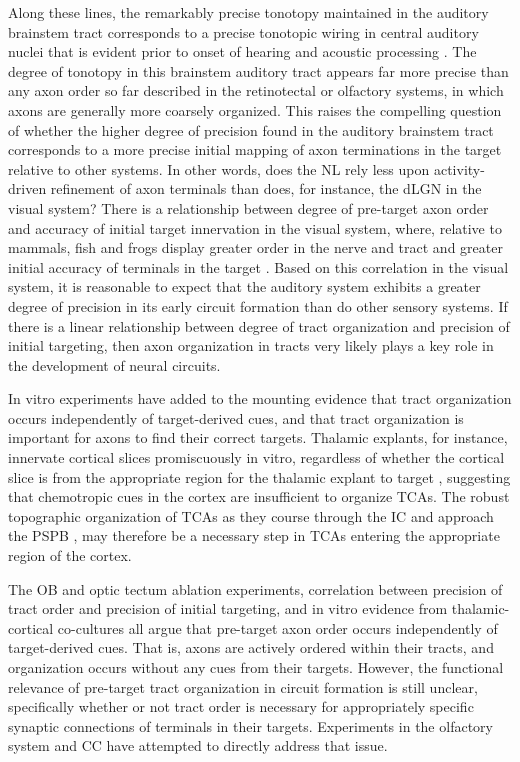 Along these lines, the remarkably precise tonotopy maintained in the auditory brainstem tract \cite{kashima2013pre} corresponds to a precise tonotopic wiring in central auditory nuclei that is evident prior to onset of hearing and acoustic processing \cite{appler2011connecting}.
The degree of tonotopy in this brainstem auditory tract appears far more precise than any axon order so far described in the retinotectal or olfactory systems, in which axons are generally more coarsely organized.
This raises the compelling question of whether the higher degree of precision found in the auditory brainstem tract corresponds to a more precise initial mapping of axon terminations in the target relative to other systems.
In other words, does the NL rely less upon activity-driven refinement of axon terminals than does, for instance, the dLGN in the visual system? 
There is a relationship between degree of pre-target axon order and accuracy of initial target innervation in the visual system, where, relative to mammals, fish and frogs display greater order in the nerve and tract and greater initial accuracy of terminals in the target \cite{simon1991relationship}.
Based on this correlation in the visual system, it is reasonable to expect that the auditory system exhibits a greater degree of precision in its early circuit formation than do other sensory systems.
If there is a linear relationship between degree of tract organization and precision of initial targeting, then axon organization in tracts very likely plays a key role in the development of neural circuits.

In vitro experiments have added to the mounting evidence that tract organization occurs independently of target-derived cues, and that tract organization is important for axons to find their correct targets.
Thalamic explants, for instance, innervate cortical slices promiscuously in vitro, regardless of whether the cortical slice is from the appropriate region for the thalamic explant to target \cite{molnar1991lack}, suggesting that chemotropic cues in the cortex are insufficient to organize TCAs.
The robust topographic organization of TCAs as they course through the IC and approach the PSPB \cite{molnar1998mechanisms}, may therefore be a necessary step in TCAs entering the appropriate region of the cortex. 

The OB and optic tectum ablation experiments, correlation between precision of tract order and precision of initial targeting, and in vitro evidence from thalamic-cortical co-cultures all argue that pre-target axon order occurs independently of target-derived cues.
That is, axons are actively ordered within their tracts, and organization occurs without any cues from their targets.
However, the functional relevance of pre-target tract organization in circuit formation is still unclear, specifically whether or not tract order is necessary for appropriately specific synaptic connections of terminals in their targets.
Experiments in the olfactory system and CC have attempted to directly address that issue.

